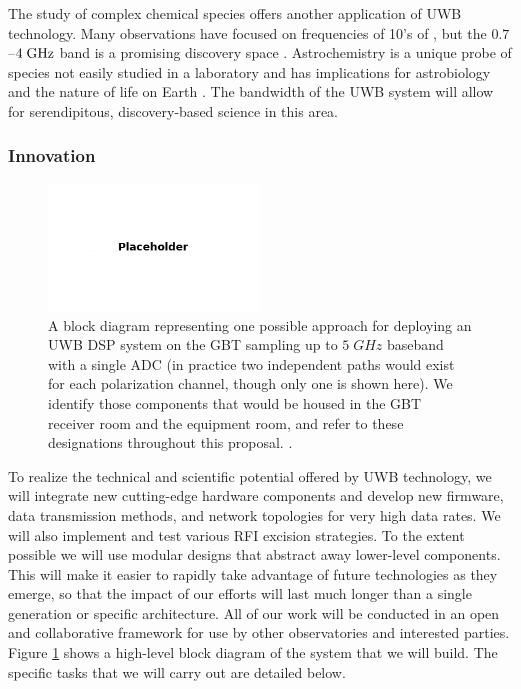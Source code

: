 \documentclass[10pt]{myNSF}
\begin{document}
The study of complex chemical species offers another application of
UWB technology.  Many observations have focused on frequencies of 10's
of \GHz, but the $0.7$--$4\; \textrm{GHz}$ band is a promising discovery space
\citep[e.g.][]{mlc+12,frsw14,thc+17}.  Astrochemistry is a unique
probe of species not easily studied in a laboratory and has
implications for astrobiology and the nature of life on Earth
\cite{mcl+16}.  The bandwidth of the UWB system will allow for
serendipitous, discovery-based science in this area.

\subsubsection{Innovation}
\label{sec:innovation}

\begin{figure}
  \centering
  \includegraphics[width=0.5\textwidth]{placeholder.png}
  \caption{A block diagram representing one possible approach for
    deploying an UWB DSP system on the GBT sampling up to $5\; GHz$
    baseband with a single ADC (in practice two independent paths
    would exist for each polarization channel, though only one is
    shown here).  We identify those components that would be housed in
    the GBT receiver room and the equipment room, and refer to these
    designations throughout this proposal. \label{fig:block_diagram}.}
\end{figure}

To realize the technical and scientific potential offered by UWB
technology, we will integrate new cutting-edge hardware components and
develop new firmware, data transmission methods, and network
topologies for very high data rates.  We will also implement and test
various RFI excision strategies.  To the extent possible we will use
modular designs that abstract away lower-level components.  This will
make it easier to rapidly take advantage of future technologies as
they emerge, so that the impact of our efforts will last much longer
than a single generation or specific architecture.  All of our work
will be conducted in an open and collaborative framework for use by
other observatories and interested parties.  Figure
\ref{fig:block_diagram} shows a high-level block diagram of the system
that we will build.  The specific tasks that we will carry out are
detailed below.
\end{document}
